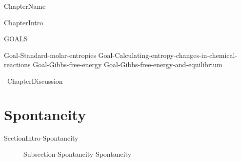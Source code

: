\documentclass[main.tex]{subfiles}
\newcommand\chapterlabel{Ch-thermo}\setcounter{figurenewcounter}{0}\setcounter{tablenewcounter}{0}\setcounter{formulanewcounter}{0}
\begin{document}
\linenumbers
  
 {ChapterName} 


      \begin{marginfigure}
\end{marginfigure}


  {ChapterIntro}


\begin{marginfigure}%
\begin{mytcbox}{GOALS}
\begin{enumerate}[label=\protect\circled{\color{white}\arabic*}]
{Goal-Standard-molar-entropies}
{Goal-Calculating-entropy-changes-in-chemical-reactions}	
{Goal-Gibbs-free-energy	}				
{Goal-Gibbs-free-energy-and-equilibrium}			
\end{enumerate}
\end{mytcbox}
\vspace{1cm}
\begin{tcolorbox}[enhanced,colback=red!5!white,colframe=black!50!red,boxrule=1pt,
  arc=0pt,outer arc=0pt,drop heavy lifted shadow]
\faGears\ 
  {ChapterDiscussion}
  \end{tcolorbox}
\end{marginfigure}%

\section{Spontaneity}
{SectionIntro-Spontaneity}
\sloppy\begin{description}
\item[] {Subsection-Spontaneity-Spontaneity}
\end{description}
\end{document}
